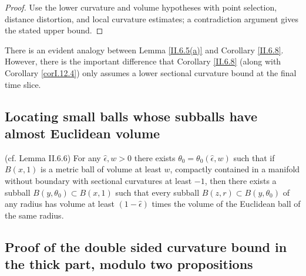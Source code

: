 \begin{proof}
\sketch Use the lower curvature and volume hypotheses with point selection, distance distortion, and local curvature estimates; a contradiction argument gives the stated upper bound.
\end{proof}

There is an evident analogy between Lemma \ref{II.6.5(a)} and
Corollary \ref{II.6.8}. However, there is the important difference that
Corollary \ref{II.6.8} (along with Corollary \ref{corI.12.4}) only
assumes a lower sectional curvature bound at the final time slice.

\subsection{Locating small balls whose subballs have almost Euclidean volume}

\begin{lemma}
  \label{lem:kl-locating-small-balls-whose-subballs-almost-euclidean-volume-existence-sectional-curvature}
 \label{Alexlemma2} (cf. Lemma II.6.6)
For any $\widehat{\epsilon}, w>0$
there exists $\theta_0 = \theta_0(\widehat{\epsilon},w)$
such that if $B(x,1)$ is a metric ball of volume at least $w$, compactly
contained in a manifold without boundary with sectional
curvatures at least $-1$, then there exists a subball
$B(y,\theta_0) \subset B(x,1)$ such that every subball
$B(z,r) \subset B(y,\theta_0)$ of any radius has volume at
least $(1-\widehat{\epsilon})$ times the volume of the Euclidean ball
of the same radius.
\end{lemma}

\begin{remark}
\label{rem:kl-locating-small-balls-whose-subballs-almost-euclidean-volume-existence-volume}
\end{remark}

\subsection{Proof of the double sided curvature bound in the thick part, modulo two propositions}

